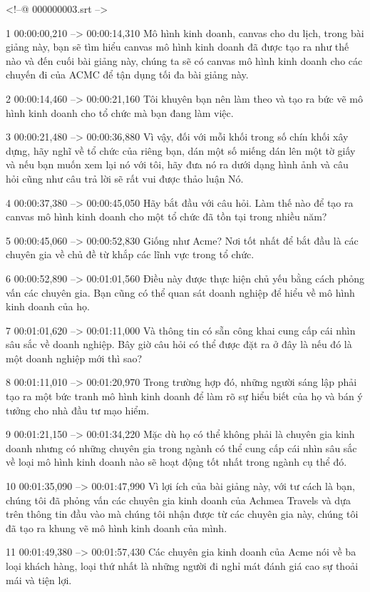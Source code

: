 <!--@ 000000003.srt -->

1
00:00:00,210 --> 00:00:14,310
Mô hình kinh doanh, canvas cho du lịch, trong bài giảng này, bạn sẽ tìm hiểu canvas mô hình kinh doanh đã được tạo ra như thế nào và đến cuối bài giảng này, chúng ta sẽ có canvas mô hình kinh doanh cho các chuyến đi của ACMC để tận dụng tối đa bài giảng này.

2
00:00:14,460 --> 00:00:21,160
Tôi khuyên bạn nên làm theo và tạo ra bức vẽ mô hình kinh doanh cho tổ chức mà bạn đang làm việc.

3
00:00:21,480 --> 00:00:36,880
Vì vậy, đối với mỗi khối trong số chín khối xây dựng, hãy nghĩ về tổ chức của riêng bạn, dán một số miếng dán lên một tờ giấy và nếu bạn muốn xem lại nó với tôi, hãy đưa nó ra dưới dạng hình ảnh và câu hỏi cũng như câu trả lời sẽ rất vui được thảo luận  Nó.

4
00:00:37,380 --> 00:00:45,050
Hãy bắt đầu với câu hỏi.  Làm thế nào để tạo ra canvas mô hình kinh doanh cho một tổ chức đã tồn tại trong nhiều năm?

5
00:00:45,060 --> 00:00:52,830
Giống như Acme?  Nơi tốt nhất để bắt đầu là các chuyên gia về chủ đề từ khắp các lĩnh vực trong tổ chức.

6
00:00:52,890 --> 00:01:01,560
Điều này được thực hiện chủ yếu bằng cách phỏng vấn các chuyên gia.  Bạn cũng có thể quan sát doanh nghiệp để hiểu về mô hình kinh doanh của họ.

7
00:01:01,620 --> 00:01:11,000
Và thông tin có sẵn công khai cung cấp cái nhìn sâu sắc về doanh nghiệp.  Bây giờ câu hỏi có thể được đặt ra ở đây là nếu đó là một doanh nghiệp mới thì sao?

8
00:01:11,010 --> 00:01:20,970
Trong trường hợp đó, những người sáng lập phải tạo ra một bức tranh mô hình kinh doanh để làm rõ sự hiểu biết của họ và bán ý tưởng cho nhà đầu tư mạo hiểm.

9
00:01:21,150 --> 00:01:34,220
Mặc dù họ có thể không phải là chuyên gia kinh doanh nhưng có những chuyên gia trong ngành có thể cung cấp cái nhìn sâu sắc về loại mô hình kinh doanh nào sẽ hoạt động tốt nhất trong ngành cụ thể đó.

10
00:01:35,090 --> 00:01:47,990
Vì lợi ích của bài giảng này, với tư cách là bạn, chúng tôi đã phỏng vấn các chuyên gia kinh doanh của Achmea Travels và dựa trên thông tin đầu vào mà chúng tôi nhận được từ các chuyên gia này, chúng tôi đã tạo ra khung vẽ mô hình kinh doanh của mình.

11
00:01:49,380 --> 00:01:57,430
Các chuyên gia kinh doanh của Acme nói về ba loại khách hàng, loại thứ nhất là những người đi nghỉ mát đánh giá cao sự thoải mái và tiện lợi.

